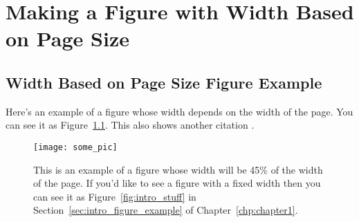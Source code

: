 \chapter{Making a Figure with Width Based on Page Size}
\label{apdx:appendixa}
\graphicspath{{figures/}{figures/appendixa/}}

\section{Width Based on Page Size Figure Example} \label{sec:appendixa_figure_example}
Here's an example of a figure whose width depends on the width
of the page. You can see it as Figure~\ref{fig:appendix_some_pic}. This also shows another citation \cite{aeyels86local}.

\begin{figure}[htbp]
  \centering
  \texttt{[image: some\_pic]}
  \caption[Example figure whose width depends on page size]{
    This is an example of a figure whose width will be 45\% of the
    width of the page. If you'd like to see a figure with a fixed
    width then you can see it as Figure~\ref{fig:intro_stuff} in
    Section~\ref{sec:intro_figure_example} of Chapter~\ref{chp:chapter1}.}
  \label{fig:appendix_some_pic}
\end{figure}